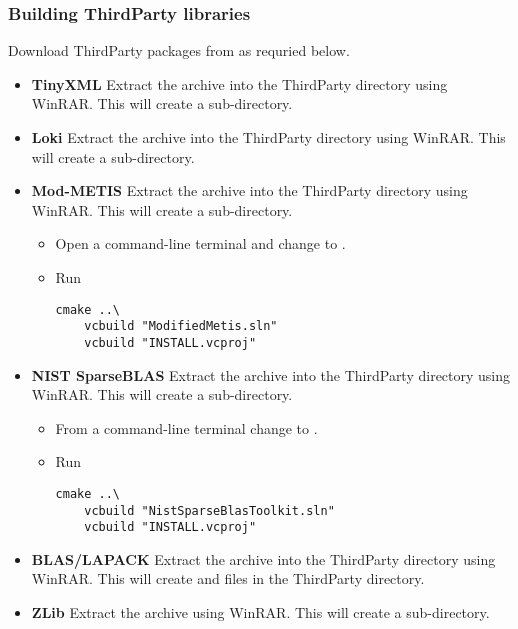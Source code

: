 \subsubsection{Building ThirdParty libraries}
Download ThirdParty packages from  as requried
below.
\begin{itemize}
\item \textbf{TinyXML} Extract the  archive into
the ThirdParty directory using WinRAR. This will create a 
sub-directory.
\item \textbf{Loki} Extract the  archive into the
ThirdParty directory using WinRAR. This will create a 
sub-directory.
\item \textbf{Mod-METIS} Extract the  archive
into the ThirdParty directory using WinRAR. This will create a
 sub-directory.
\begin{itemize}
  \item Open a command-line terminal and change to
   .
  \item Run
    \begin{lstlisting}[style=BashInputStyle]
    cmake ..\
    vcbuild "ModifiedMetis.sln"
    vcbuild "INSTALL.vcproj"
    \end{lstlisting}
\end{itemize}
\item \textbf{NIST SparseBLAS} Extract the  archive
into the ThirdParty directory using WinRAR. This will create a
\inlsh{spblastk0.9b} sub-directory.
\begin{itemize}
  \item From a command-line terminal change to
  .
  \item Run
    \begin{lstlisting}[style=BashInputStyle]
    cmake ..\
    vcbuild "NistSparseBlasToolkit.sln"
    vcbuild "INSTALL.vcproj"
    \end{lstlisting}
\end{itemize}
\item \textbf{BLAS/LAPACK} Extract the  archive
into the ThirdParty directory using WinRAR. This will create
\inlsh{blas\_win32.*} and \inlsh{lapack\_win32.*} files in the ThirdParty
directory.

\item \textbf{ZLib} Extract the  archive using
WinRAR. This will create a  sub-directory.


\end{itemize}
